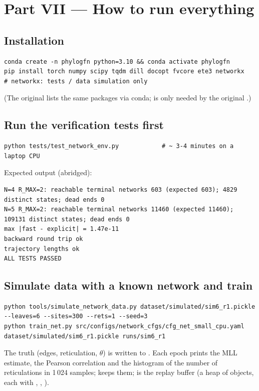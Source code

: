 \section{Part VII --- How to run everything}

\subsection{Installation}
\begin{lstlisting}[style=sh]
conda create -n phylogfn python=3.10 && conda activate phylogfn
pip install torch numpy scipy tqdm dill docopt fvcore ete3 networkx     # networkx: tests / data simulation only
\end{lstlisting}
(The original  lists the same packages via conda;  is only needed by the original .)

\subsection{Run the verification tests first}
\begin{lstlisting}[style=sh]
python tests/test_network_env.py            # ~ 3-4 minutes on a laptop CPU
\end{lstlisting}
Expected output (abridged):
\begin{lstlisting}[style=sh]
N=4 R_MAX=2: reachable terminal networks 603 (expected 603); 4829 distinct states; dead ends 0
N=5 R_MAX=2: reachable terminal networks 11460 (expected 11460); 109131 distinct states; dead ends 0
max |fast - explicit| = 1.47e-11
backward round trip ok
trajectory lengths ok
ALL TESTS PASSED
\end{lstlisting}

\subsection{Simulate data with a known network and train}
\begin{lstlisting}[style=sh]
python tools/simulate_network_data.py dataset/simulated/sim6_r1.pickle --leaves=6 --sites=300 --rets=1 --seed=3
python train_net.py src/configs/network_cfgs/cfg_net_small_cpu.yaml dataset/simulated/sim6_r1.pickle runs/sim6_r1
\end{lstlisting}
The truth (edges, reticulation, $\theta$) is written to . Each epoch prints the MLL estimate, the Pearson correlation and the histogram of the number of reticulations in 1\,024 samples;  keeps them;  is the replay buffer (a heap of  objects, each with , , ).

